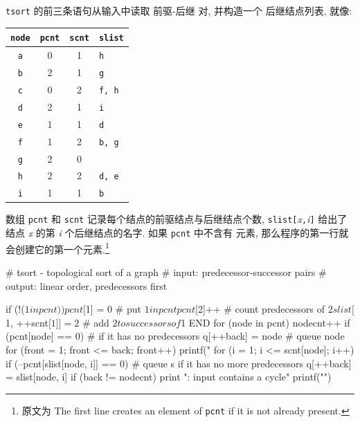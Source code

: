 \texttt{tsort} 的前三条语句从输入中读取 \mbox{前驱}-后继 对, 并构造一个
后继结点列表, 就像:
\begin{center}
\begin{tabular}{c|c|c|l}
    \hline
    \hline
    \texttt{node}  & \texttt{pcnt} & \texttt{scnt} & \texttt{slist} \\
    \hline
    \texttt{a}  & 0 & 1 & \texttt{h} \\
    \texttt{b}  & 2 & 1 & \texttt{g} \\
    \texttt{c}  & 0 & 2 & \texttt{f, h} \\
    \texttt{d}  & 2 & 1 & \texttt{i} \\
    \texttt{e}  & 1 & 1 & \texttt{d} \\
    \texttt{f}  & 1 & 2 & \texttt{b, g} \\
    \texttt{g}  & 2 & 0 &  \\
    \texttt{h}  & 2 & 2 & \texttt{d, e}  \\
    \texttt{i}  & 1 & 1 & \texttt{b}  \\
    \hline
\end{tabular}
\end{center}

数组 \texttt{pcnt} 和 \texttt{scnt} 记录每个结点的前驱结点与后继结点个数,
\texttt{slist[}\textit{x}\texttt{,}\textit{i}\texttt{]} 给出了结点 
\textit{x} 的第 \textit{i} 个后继结点的名字. 如果 \texttt{pcnt} 中不含有
元素, 那么程序的第一行就会创建它的第一个元素.\footnote{原文为 The first
line creates an element of \texttt{pcnt} if it is not already present.}
\begin{awkcode}
    # tsort - topological sort of a graph
    #   input:  predecessor-successor pairs
    #   output: linear order, predecessors first

        { if (!($1 in pcnt))
              pcnt[$1] = 0           # put $1 in pcnt
          pcnt[$2]++                 # count predecessors of $2
          slist[$1, ++scnt[$1]] = $2 # add $2 to successors of $1
        }
    END { for (node in pcnt) {
              nodecnt++
              if (pcnt[node] == 0)   # if it has no predecessors
                  q[++back] = node   # queue node
          }
          for (front = 1; front <= back; front++) {
              printf(" %
              for (i = 1; i <= scnt[node]; i++)
                  if (--pcnt[slist[node, i]] == 0)
                      # queue s if it has no more predecessors
                      q[++back] = slist[node, i]
          }
          if (back != nodecnt)
              print "\nerror: input contains a cycle"
          printf("\n")
        }
\end{awkcode}

